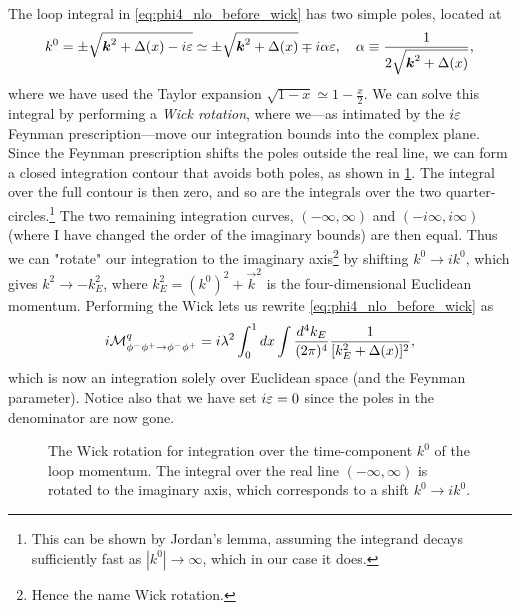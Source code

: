 The loop integral in \cref{eq:phi4_nlo_before_wick} has two simple poles, located at
\begin{equation}
    k^0 = \pm\sqrt{\boldsymbol{k}^2+\Delta(x)-i\varepsilon} \simeq \pm\sqrt{\boldsymbol{k}^2+\Delta(x)} \mp i\alpha\varepsilon,
    \quad \alpha \equiv \frac{1}{2\sqrt{\boldsymbol{k}^2+\Delta(x)}},
\end{equation}
where we have used the Taylor expansion $\sqrt{1-x}\simeq 1-\frac{x}{2}$.
We can solve this integral by performing a \emph{Wick rotation}, where we---as intimated by the $i\varepsilon$ Feynman prescription---move our integration bounds into the complex plane.
Since the Feynman prescription shifts the poles outside the real line, we can form a closed integration contour that avoids both poles, as shown in \cref{fig:wick_rotation}.
The integral over the full contour is then zero, and so are the integrals over the two quarter-circles.\footnote{This can be shown by Jordan's lemma, assuming the integrand decays sufficiently fast as $|k^0|\to\infty$, which in our case it does.}
The two remaining integration curves, $(-\infty,\infty)$ and $(-i\infty,i\infty)$ (where I have changed the order of the imaginary bounds) are then equal.
Thus we can "rotate" our integration to the imaginary axis\footnote{Hence the name Wick rotation.} by shifting $k^0\to ik^0$, which gives $k^2 \to -k_E^2$, where $k_E^2 = (k^0)^2 + \vec{k}^2$ is the four-dimensional Euclidean momentum.
Performing the Wick lets us rewrite \cref{eq:phi4_nlo_before_wick} as
\begin{equation}\label{eq:phi4_nlo_euclidean}
    i\mathcal{M}_{\phi^-\phi^+\to\phi^-\phi^+}^q = i\lambda^2 \int_0^1 dx \int\frac{d^4k_E}{(2\pi)^4} \frac{1}{[k_E^2 + \Delta(x)]^2},
\end{equation}
which is now an integration solely over Euclidean space (and the Feynman parameter).
Notice also that we have set $i\varepsilon=0$ since the poles in the denominator are now gone.

\begin{figure}
    \centering
    \caption{The Wick rotation for integration over the time-component $k^0$ of the loop momentum. The integral over the real line $(-\infty,\infty)$ is rotated to the imaginary axis, which corresponds to a shift $k^0\to ik^0$.}
    \label{fig:wick_rotation}
\end{figure}


